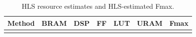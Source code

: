 \begin{table}[t]
  \centering
  \caption{HLS resource estimates and HLS-estimated Fmax.}
  \label{tab:resource-fmax}
  \footnotesize
  \begin{tabular}{lrrrrrr}
    \hline
    Method & BRAM & DSP & FF & LUT & URAM & Fmax\\
    \hline
    \multicolumn{7}{c}{\pending{}}\\
    \hline
  \end{tabular}
\end{table}

